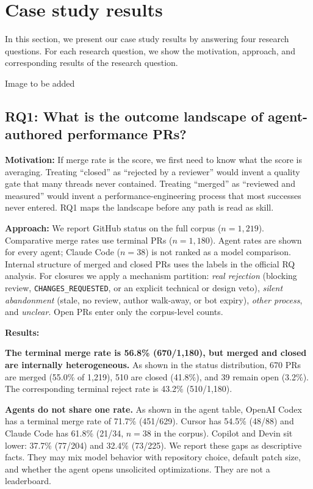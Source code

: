 \section{Case study results}
\label{result}
In this section, we present our case study results by answering four research questions. For each research question, we show the motivation, approach, and corresponding results of the research question.

{\color{red}Image to be added}

\subsection{RQ1: What is the outcome landscape of agent-authored performance PRs?}
\label{RQ1}

\noindent\textbf{Motivation:} 
If merge rate is the score, we first need to know what the score is averaging. Treating “closed” as “rejected by a reviewer” would invent a quality gate that many threads never contained. Treating “merged” as “reviewed and measured” would invent a performance-engineering process that most successes never entered. RQ1 maps the landscape before any path is read as skill.

\noindent\textbf{Approach:}
We report GitHub status on the full corpus (\(n=1{,}219\)). Comparative merge rates use terminal PRs (\(n=1{,}180\)). Agent rates are shown for every agent; Claude Code (\(n=38\)) is not ranked as a model comparison. Internal structure of merged and closed PRs uses the labels in the official RQ analysis. For closures we apply a mechanism partition: \emph{real rejection} (blocking review, \texttt{CHANGES\_REQUESTED}, or an explicit technical or design veto), \emph{silent abandonment} (stale, no review, author walk-away, or bot expiry), \emph{other process}, and \emph{unclear}. Open PRs enter only the corpus-level counts.

\noindent\textbf{Results:}

\textbf{The terminal merge rate is 56.8\% (670/1{,}180), but merged and closed are internally heterogeneous.} As shown in the status distribution, 670 PRs are merged (55.0\% of 1{,}219), 510 are closed (41.8\%), and 39 remain open (3.2\%). The corresponding terminal reject rate is 43.2\% (510/1{,}180).

\textbf{Agents do not share one rate.} As shown in the agent table, OpenAI Codex has a terminal merge rate of 71.7\% (451/629). Cursor has 54.5\% (48/88) and Claude Code has 61.8\% (21/34, \(n=38\) in the corpus). Copilot and Devin sit lower: 37.7\% (77/204) and 32.4\% (73/225). We report these gaps as descriptive facts. They may mix model behavior with repository choice, default patch size, and whether the agent opens unsolicited optimizations. They are not a leaderboard.

